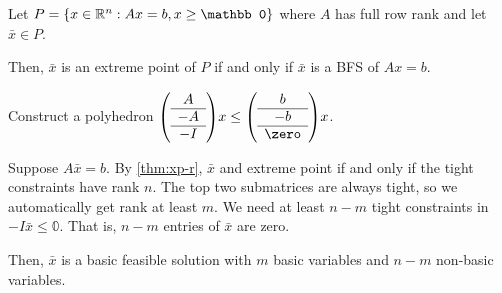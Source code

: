 \begin{theorem}
  Let $P = \{x \in \R^n : Ax = b, x \geq \mathbb0\}$
  where $A$ has full row rank and let $\bar x \in P$.

  Then, $\bar x$ is an extreme point of $P$ if and only if
  $\bar x$ is a BFS of $Ax = b$.
\end{theorem}
\begin{prf}
  Construct a polyhedron
  $\qty(\begin{array}{c}A \\\hline -A \\\hline -I\end{array})x
    \leq \qty(\begin{array}{c}b \\\hline -b \\\hline \zero\end{array})x$.

  Suppose $A\bar x = b$.
  By \cref{thm:xp-r}, $\bar x$ and extreme point if and only if
  the tight constraints have rank $n$.
  The top two submatrices are always tight,
  so we automatically get rank at least $m$.
  We need at least $n-m$ tight constraints in $-I\bar x \leq \mathbb0$.
  That is, $n-m$ entries of $\bar x$ are zero.
  
  Then, $\bar x$ is a basic feasible solution
  with $m$ basic variables and $n-m$ non-basic variables.
\end{prf}
